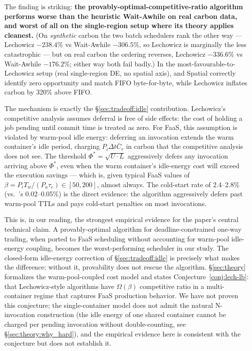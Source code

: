 The finding is striking: \textbf{the provably-optimal-competitive-ratio
algorithm performs worse than the heuristic Wait-Awhile on real
carbon data, and worst of all on the single-region setup where its
theory applies cleanest.} (On \emph{synthetic} carbon the two batch
schedulers rank the other way --- Lechowicz $-238.4\%$ vs
Wait-Awhile $-306.5\%$, so Lechowicz is marginally the less
catastrophic --- but on real carbon the ordering reverses, Lechowicz
$-336.6\%$ vs Wait-Awhile $-176.2\%$; either way both fail badly.)
In the most-favourable-to-Lechowicz setup
(real single-region DE, no spatial axis), \GreenFaaS{} and Spatial
correctly identify zero opportunity and match FIFO byte-for-byte,
while Lechowicz inflates carbon by 320\% above FIFO.

The mechanism is exactly the
\S\ref{sec:tradeoff:idle} contribution. Lechowicz's competitive
analysis assumes deferral is free of side effects: the cost of holding
a job pending until commit time is treated as zero. For FaaS, this
assumption is violated by warm-pool idle energy: deferring an
invocation extends the warm container's idle period, charging
$P_i \Delta t \bar{C}_r$ in carbon that the competitive analysis does
not see. The threshold $\Phi^* = \sqrt{U \cdot L}$ aggressively
defers any invocation arriving above $\Phi^*$, even when the warm
container's idle-energy cost will exceed the execution savings ---
which is, given typical FaaS values of $\beta = P_i T_w / (P_a
\tau_e) \in [50, 200]$, almost always. The cold-start rate of
2.4--2.8\% (vs.\ \GreenFaaS's 0.02--0.05\%) is the direct evidence: the
algorithm aggressively defers past warm-pool TTLs and pays cold-start
penalties on most invocations.

This is, in our reading, the strongest empirical evidence for the
paper's central technical claim. A provably-optimal algorithm for
deadline-constrained one-way trading, when ported to FaaS scheduling
without accounting for warm-pool idle-energy coupling, becomes the
worst-performing scheduler in our study. The closed-form idle-energy
correction of \S\ref{sec:tradeoff:idle} is precisely what makes the
difference; without it, provability does not rescue the algorithm.
\S\ref{sec:theory} formalizes the warm-pool-coupled cost model
and states Conjecture~\ref{conj:lech-lb}: that
Lechowicz-style algorithms have $\Omega(\beta)$ competitive ratio
in a multi-container regime that captures FaaS production behavior.
We have not proven this conjecture; the single-container model does
not admit the natural N-invocation construction (the idle energy of
one shared container cannot be charged per pending invocation without
double-counting, see \S\ref{sec:theory:why_hard}), and the empirical
evidence here is consistent with the conjecture but does not
establish it.

